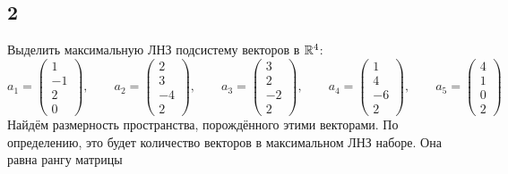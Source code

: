 \subsection{2}

Выделить максимальную ЛНЗ подсистему векторов в $ \mathbb{R}^4 $:
$$ a_1 =
\begin{pmatrix}
	1 \\
    -1 \\
    2 \\
    0
\end{pmatrix}, \qquad a_2 =
\begin{pmatrix}
	2 \\
    3 \\
    -4 \\
    2
\end{pmatrix}, \qquad a_3 =
\begin{pmatrix}
	3 \\
    2 \\
    -2 \\
    2
\end{pmatrix}, \qquad a_4 =
\begin{pmatrix}
	1 \\
    4 \\
    -6 \\
    2
\end{pmatrix}, \qquad a_5 =
\begin{pmatrix}
	4 \\
    1 \\
    0 \\
    2
\end{pmatrix} $$
Найдём размерность пространства, порождённого этими векторами. По определению, это будет количество векторов в максимальном ЛНЗ наборе. Она равна рангу матрицы
